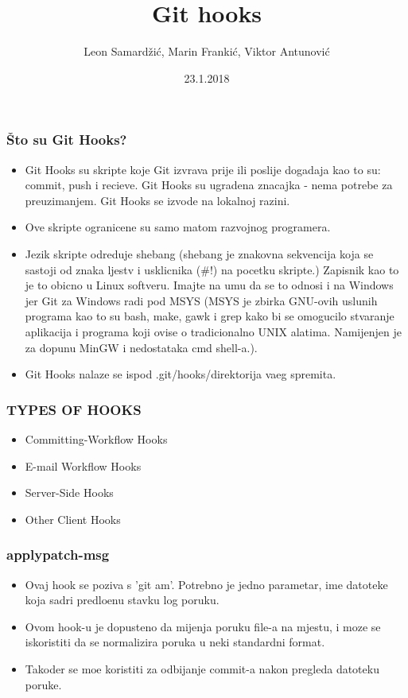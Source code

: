 \documentclass{beamer}
\title{Git hooks}
\author{Leon Samardžić, Marin Frankić, Viktor Antunović}
\institute{Preddiplomski studij računarstva, Tehnički fakultet, Sveučilište u Rijeci}
\date{23.1.2018}
\begin{document}
\maketitle

\newpage

    
\begin{frame}
\frametitle{Što su Git Hooks?}
\begin{itemize}
    \item Git Hooks su skripte koje Git izvrava prije ili poslije dogadaja kao to su: commit, push i recieve. Git Hooks su ugradena znacajka - nema potrebe za preuzimanjem. Git Hooks se izvode na lokalnoj razini.
    \item Ove skripte ogranicene su samo matom razvojnog programera.
    \item Jezik skripte odreduje shebang (shebang je znakovna sekvencija koja se sastoji od znaka ljestv i usklicnika (#!) na pocetku skripte.) Zapisnik kao to je to obicno u Linux softveru. Imajte na umu da se to odnosi i na Windows jer Git za Windows radi pod MSYS (MSYS je zbirka GNU-ovih uslunih programa kao to su bash, make, gawk i grep kako bi se omogucilo stvaranje aplikacija i programa koji ovise o tradicionalno UNIX alatima. Namijenjen je za dopunu MinGW i nedostataka cmd shell-a.).
    \item Git Hooks nalaze se ispod .git/hooks/direktorija vaeg spremita.
\end{itemize}
\end{frame}

\begin{frame}
\frametitle{TYPES OF HOOKS}
\begin{itemize}
    \item Committing-Workflow Hooks
    \item E-mail Workflow Hooks
    \item Server-Side Hooks
    \item Other Client Hooks
\end{itemize}
\end{frame}


\begin{frame}
\frametitle{applypatch-msg}
\begin{itemize}
    \item Ovaj hook se poziva s 'git am'. Potrebno je jedno parametar, ime datoteke koja sadri predloenu stavku log poruku.
    \item Ovom hook-u je dopusteno da mijenja poruku file-a na mjestu, i moze se iskoristiti da se normalizira poruka u neki standardni format.
    \item Takoder se moe koristiti za odbijanje commit-a nakon pregleda datoteku poruke.
\end{itemize}
\end{frame}
\end{document}
